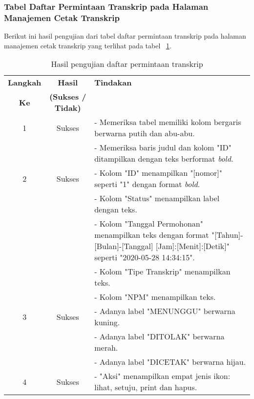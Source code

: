 \subsubsection{Tabel Daftar Permintaan Transkrip pada Halaman Manajemen Cetak Transkrip}
Berikut ini hasil pengujian dari tabel daftar permintaan transkrip pada halaman manajemen cetak transkrip yang terlihat pada tabel ~\ref{hasil:DaftarPermintaanTranskrip}.
\begin{table}[H]
	\centering 
	\caption{Hasil pengujian daftar permintaan transkrip}
	\label{hasil:DaftarPermintaanTranskrip}
	\begin{tabular}{|c| c| p{}|}
		\toprule
		\textbf{Langkah} & \textbf{Hasil} & \textbf{Tindakan}\\
		\textbf{Ke} & \textbf{(Sukses / Tidak)} &\\
		\midrule
		1&Sukses&- Memeriksa tabel memiliki kolom bergaris berwarna putih dan abu-abu.\\
		&& - Memeriksa baris judul dan kolom "ID" ditampilkan dengan teks berformat \textit{bold}.	\\	
		\hline
		2&Sukses&- Kolom "ID" menampilkan "[nomor]" seperti "1" dengan format \textit{bold}.\\
		&&- Kolom "Status" menampilkan label dengan teks.\\
		&&- Kolom "Tanggal Permohonan" menampilkan teks dengan format "[Tahun]-[Bulan]-[Tanggal] [Jam]:[Menit]:[Detik]" seperti "2020-05-28 14:34:15".\\
		&&- Kolom "Tipe Transkrip" menampilkan teks.\\
		&&- Kolom "NPM" menampilkan teks.\\
		\hline
		3&Sukses& - Adanya label "MENUNGGU" berwarna kuning.\\
		&& - Adanya label "DITOLAK" berwarna merah.\\
		&& - Adanya label "DICETAK" berwarna hijau.\\
		\hline
		4&Sukses&- "Aksi" menampilkan empat jenis ikon: lihat, setuju, print dan hapus.\\
		
		\bottomrule		
	\end{tabular} 
\end{table}

